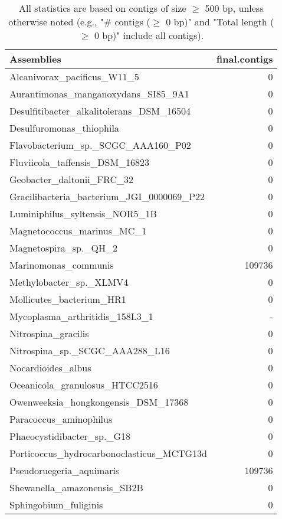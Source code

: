 \documentclass[12pt,a4paper]{article}
\begin{document}
\begin{table}[ht]
\begin{center}
\caption{All statistics are based on contigs of size $\geq$ 500 bp, unless otherwise noted (e.g., "\# contigs ($\geq$ 0 bp)" and "Total length ($\geq$ 0 bp)" include all contigs).}
\begin{tabular}{|l*{1}{|r}|}
\hline
Assemblies & final.contigs \\ \hline
Alcanivorax\_pacificus\_W11\_5 & 0 \\ \hline
Aurantimonas\_manganoxydans\_SI85\_9A1 & 0 \\ \hline
Desulfitibacter\_alkalitolerans\_DSM\_16504 & 0 \\ \hline
Desulfuromonas\_thiophila & 0 \\ \hline
Flavobacterium\_sp.\_SCGC\_AAA160\_P02 & 0 \\ \hline
Fluviicola\_taffensis\_DSM\_16823 & 0 \\ \hline
Geobacter\_daltonii\_FRC\_32 & 0 \\ \hline
Gracilibacteria\_bacterium\_JGI\_0000069\_P22 & 0 \\ \hline
Luminiphilus\_syltensis\_NOR5\_1B & 0 \\ \hline
Magnetococcus\_marinus\_MC\_1 & 0 \\ \hline
Magnetospira\_sp.\_QH\_2 & 0 \\ \hline
Marinomonas\_communis & 109736 \\ \hline
Methylobacter\_sp.\_XLMV4 & 0 \\ \hline
Mollicutes\_bacterium\_HR1 & 0 \\ \hline
Mycoplasma\_arthritidis\_158L3\_1 & - \\ \hline
Nitrospina\_gracilis & 0 \\ \hline
Nitrospina\_sp.\_SCGC\_AAA288\_L16 & 0 \\ \hline
Nocardioides\_albus & 0 \\ \hline
Oceanicola\_granulosus\_HTCC2516 & 0 \\ \hline
Owenweeksia\_hongkongensis\_DSM\_17368 & 0 \\ \hline
Paracoccus\_aminophilus & 0 \\ \hline
Phaeocystidibacter\_sp.\_G18 & 0 \\ \hline
Porticoccus\_hydrocarbonoclasticus\_MCTG13d & 0 \\ \hline
Pseudoruegeria\_aquimaris & 109736 \\ \hline
Shewanella\_amazonensis\_SB2B & 0 \\ \hline
Sphingobium\_fuliginis & 0 \\ \hline

\end{tabular}
\end{center}
\end{table}
\end{document}
